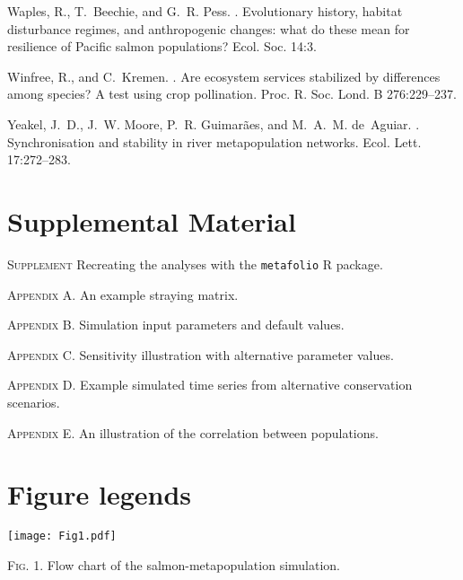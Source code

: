 \documentclass[12pt,english]{article}
\begin{document}
\begin{spacing}{1.3}
\begin{thebibliography}{64}
Waples, R., T.~Beechie, and G.~R. Pess.
.
\newblock Evolutionary history, habitat disturbance regimes, and anthropogenic
  changes: what do these mean for resilience of {Pacific} salmon populations?
\newblock Ecol. Soc. 14:3.

Winfree, R., and C.~Kremen.
.
\newblock Are ecosystem services stabilized by differences among species? {A}
  test using crop pollination.
\newblock Proc. R. Soc. Lond. B 276:229--237.

Yeakel, J.~D., J.~W. Moore, P.~R. Guimar{\~a}es, and M.~A.~M. de~Aguiar.
.
\newblock Synchronisation and stability in river metapopulation networks.
\newblock Ecol. Lett. 17:272--283.

\end{thebibliography}

\clearpage

\section{Supplemental Material}

\noindent
\textsc{Supplement} Recreating the analyses with the \texttt{metafolio} \textsf{R} package.

\noindent
\textsc{Appendix A.} An example straying matrix.

\noindent
\textsc{Appendix B.} Simulation input parameters and default values.

\noindent
\textsc{Appendix C.} Sensitivity illustration with alternative parameter values.

\noindent
\textsc{Appendix D.} Example simulated time series from alternative conservation scenarios.

\noindent
\textsc{Appendix E.} An illustration of the correlation between populations.

\clearpage

\section{Figure legends}

\begin{center}
\texttt{[image: Fig1.pdf]}
\end{center}
\bigskip
\noindent
\textsc{Fig. 1}. Flow chart of the salmon-metapopulation simulation.


\end{spacing}
\end{document}
